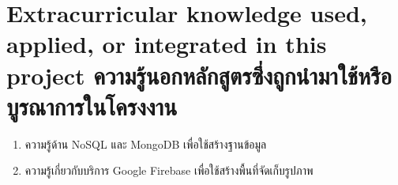 \section{\ifenglish%
Extracurricular knowledge used, applied, or integrated in this project
\else%
ความรู้นอกหลักสูตรซึ่งถูกนำมาใช้หรือบูรณาการในโครงงาน
\fi
}

\begin{enumerate}
  \item ความรู้ด้าน NoSQL และ MongoDB เพื่อใช้สร้างฐานข้อมูล
  \item ความรู้เกี่ยวกับบริการ Google Firebase เพื่อใช้สร้างพื้นที่จัดเก็บรูปภาพ
\end{enumerate}
